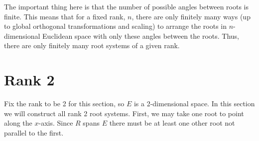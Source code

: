 \documentclass[fleqn]{NotesClass}
\begin{document}
    The important thing here is that the number of possible angles between roots is finite.
    This means that for a fixed rank, \(n\), there are only finitely many ways (up to global orthogonal transformations and scaling) to arrange the roots in \(n\)-dimensional Euclidean space with only these angles between the roots.
    Thus, there are only finitely many root systems of a given rank.
    
    \section{Rank 2}
    Fix the rank to be 2 for this section, so \(E\) is a 2-dimensional space.
    In this section we will construct all rank 2 root systems.
    First, we may take one root to point along the \(x\)-axis.
    Since \(R\) spans \(E\) there must be at least one other root not parallel to the first.
    
\end{document}
